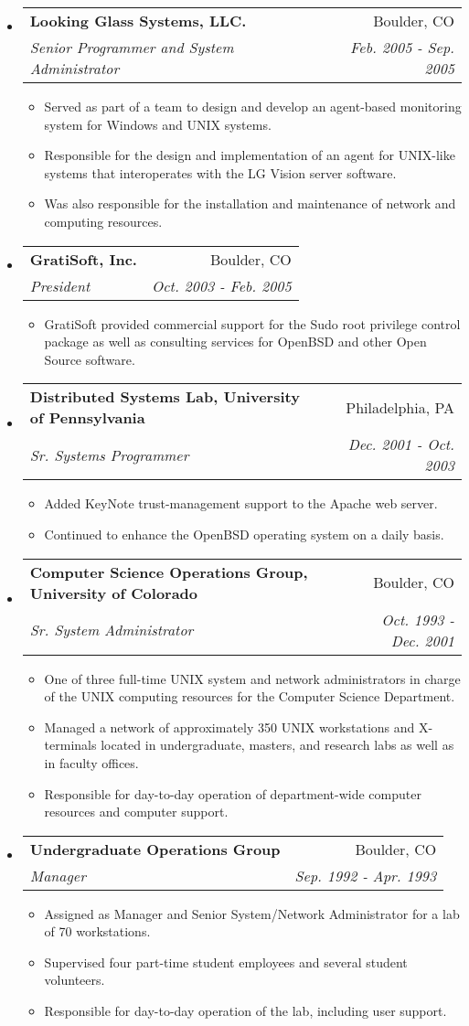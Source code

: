 \documentclass[letterpaper,11pt]{article}
\makeatletter
\newcommand{\resitem}[1]{\item #1 \vspace{-2pt}}
\newcommand{\ressubheading}[4]{
\begin{tabular*}{7.0in}{l@{\extracolsep{\fill}}r}
		\textbf{#1} & #2 \\
		\textit{#3} & \textit{#4} \\
\end{tabular*}\vspace{-6pt}}
\makeatother
\begin{document}
\begin{itemize}
\item 
	\ressubheading{Looking Glass Systems, LLC.}{Boulder, CO}{Senior Programmer and System Administrator}{Feb. 2005 - Sep. 2005}
	\begin{itemize}
		\resitem{Served as part of a team to design and develop an agent-based monitoring system for Windows and {\sc UNIX} systems.}
		\resitem{Responsible for the design and implementation of an agent for UNIX-like systems that interoperates with the LG Vision server software.}
		\resitem{Was also responsible for the installation and maintenance of network and computing resources.}
	\end{itemize}

\item
	\ressubheading{GratiSoft, Inc.}{Boulder, CO}{President}{Oct. 2003 - Feb. 2005}
	\begin{itemize}
		\resitem{GratiSoft provided commercial support for the Sudo root privilege control package as well as consulting services for OpenBSD and other Open Source software.}
	\end{itemize}

\item
	\ressubheading{Distributed Systems Lab, University of Pennsylvania}{Philadelphia, PA}{Sr. Systems Programmer}{Dec. 2001 - Oct. 2003}
	\begin{itemize}
		\resitem{Added KeyNote trust-management support to the Apache web server.}
		\resitem{Continued to enhance the OpenBSD operating system on a daily basis.}
	\end{itemize}

\item
	\ressubheading{Computer Science Operations Group, University of Colorado}{Boulder, CO}{Sr. System Administrator}{Oct. 1993 - Dec. 2001}
	\begin{itemize}
		\resitem{One of three full-time {\sc UNIX} system and network administrators in charge of the {\sc UNIX} computing resources for the Computer Science Department.}
		\resitem{Managed a network of approximately 350 {\sc UNIX} workstations and X-terminals located in undergraduate, masters, and research labs as well as in faculty offices.}
		\resitem{Responsible for day-to-day operation of department-wide computer resources and computer support.}
	\end{itemize}

\item
	\ressubheading{Undergraduate Operations Group}{Boulder, CO}{Manager}{Sep. 1992 - Apr. 1993}
	\begin{itemize}
		\resitem{Assigned as Manager and Senior System/Network Administrator for a lab of 70 workstations.}
		\resitem{Supervised four part-time student employees and several student volunteers.}
		\resitem{Responsible for day-to-day operation of the lab, including user support.}
	\end{itemize}


\end{itemize}
\end{document}

